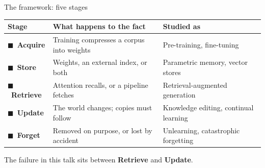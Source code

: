 \documentclass[aspectratio=169]{beamer}
\begin{document}
\begin{frame}{The framework: five stages}
  \begin{center}
  \small
  \begin{tabular}{@{}p{2.4cm}p{5.3cm}p{4.6cm}@{}}
    \toprule
    \textbf{Stage} & \textbf{What happens to the fact} & \textbf{Studied as} \\
    \midrule
    \textcolor{acquire}{$\blacksquare$}\ \textbf{Acquire}   & Training compresses a corpus into weights & Pre-training, fine-tuning \\[2pt]
    \textcolor{store}{$\blacksquare$}\ \textbf{Store}       & Weights, an external index, or both       & Parametric memory, vector stores \\[2pt]
    \textcolor{retrieve}{$\blacksquare$}\ \textbf{Retrieve} & Attention recalls, or a pipeline fetches  & Retrieval-augmented generation \\[2pt]
    \textcolor{update}{$\blacksquare$}\ \textbf{Update}     & The world changes; copies must follow     & Knowledge editing, continual learning \\[2pt]
    \textcolor{forget}{$\blacksquare$}\ \textbf{Forget}     & Removed on purpose, or lost by accident   & Unlearning, catastrophic forgetting \\
    \bottomrule
  \end{tabular}
  \end{center}
  \vspace{0.9em}
  \begin{center}
    The failure in this talk sits between
    \textcolor{retrieve}{\textbf{Retrieve}} and \textcolor{update}{\textbf{Update}}.
  \end{center}
\end{frame}
\end{document}
